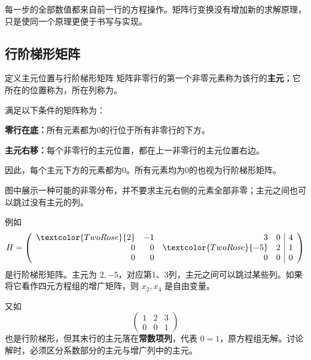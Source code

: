\documentclass[a4paper,12pt,twoside,openany,fontset=none]{ctexbook}
\newcounter{definition}[chapter]
\newenvironment{definition}[1][]{\begin{defBox}{定义}{#1}}{\end{defBox}}
\numberwithin{equation}{chapter}
\begin{document}
每一步的全部数值都来自前一行的方程操作。矩阵行变换没有增加新的求解原理，只是使同一个原理更便于书写与实现。

\subsection*{行阶梯形矩阵}

\begin{definition}[主元位置与行阶梯形矩阵]
矩阵非零行的第一个非零元素称为该行的\textbf{主元}；它所在的位置称为\textbf{}，所在列称为\textbf{}。

满足以下条件的矩阵称为\textbf{}：

\textbf{零行在底：}所有元素都为0的行位于所有非零行的下方。

\textbf{主元右移：}每个非零行的主元位置，都在上一非零行的主元位置右边。

因此，每个主元下方的元素都为0。所有元素均为0的也视为行阶梯形矩阵。
\end{definition}


图中展示一种可能的非零分布，并不要求主元右侧的元素全部非零；主元之间也可以跳过没有主元的列。

例如
\[
 H=\left(\begin{array}{rrrr|r}
 \textcolor{TwoRose}{2}&-1&3&0&4\\
 0&0&\textcolor{TwoRose}{-5}&2&1\\
 0&0&0&0&0
 \end{array}\right)
\]
是行阶梯形矩阵。主元为 $2,-5$，对应第1、3列，主元之间可以跳过某些列。如果将它看作四元方程组的增广矩阵，则 $x_2,x_4$ 是自由变量。

又如
\[
 \left(\begin{array}{rr|r}1&2&3\\0&0&1\end{array}\right)
\]
也是行阶梯形，但其末行的主元落在\textbf{常数项列}，代表 $0=1$，原方程组无解。讨论解时，必须区分系数部分的主元与增广列中的主元。
\end{document}
